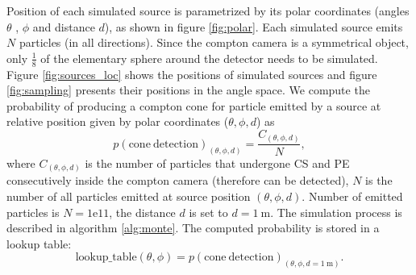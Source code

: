 
Position of each simulated source is parametrized by its polar coordinates (angles $\theta$ , $\phi$ and distance $d$), as shown in figure \ref{fig:polar}.
Each simulated source emits $N$ particles (in all directions).
Since the compton camera is a symmetrical object, only $\frac{1}{8}$ of the elementary sphere around the detector needs to be simulated.
Figure \ref{fig:sources_loc} shows the positions of simulated sources and figure \ref{fig:sampling} presents their positions in the angle space.
We compute the probability of producing a compton cone for particle emitted by a source at relative position given by polar coordinates ($\theta, \phi, d$) as
\begin{equation}
  p(\mathrm{cone\ detection})_{(\theta, \phi, d)} = \frac{C_{(\theta, \phi, d)}}{N},
\end{equation} 
where $C_{(\theta, \phi, d)}$ is the number of particles that undergone \ac{CS} and \ac{PE} consecutively inside the compton camera (therefore can be detected), $N$ is the number of all particles emitted at source position $(\theta, \phi, d)$. 
Number of emitted particles is $N = 1\mathrm{e}11$, the distance $d$ is set to $d = \SI{1}\meter$.
The simulation process is described in algorithm \ref{alg:monte}. 
The computed probability is stored in a lookup table:
\begin{equation}
  \mathrm{lookup\_table}(\theta, \phi) = p(\mathrm{cone\ detection})_{(\theta, \phi, d = \SI{1}\meter)}.
\end{equation}

